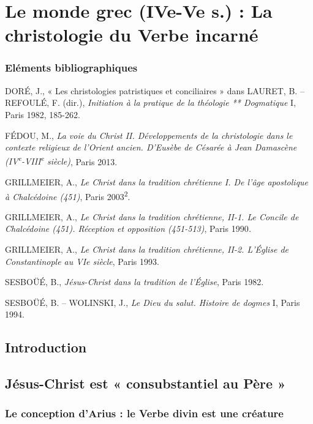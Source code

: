 

\chapter{Le monde grec (IVe-Ve s.) :
La christologie du Verbe incarné}




\subsection{Eléments bibliographiques}

DORÉ, J., « Les christologies patristiques et conciliaires » dans
LAURET, B. -- REFOULÉ, F. (dir.), \emph{Initiation à la pratique de la
théologie ** Dogmatique} I, Paris 1982, 185-262.

FÉDOU, M., \emph{La voie du Christ II. Développements de la christologie
dans le contexte religieux de l'Orient ancien. D'Eusèbe de Césarée à
Jean Damascène (IV\textsuperscript{e}-VIII\textsuperscript{e} siècle)},
Paris 2013.

GRILLMEIER, A., \emph{Le Christ dans la tradition chrétienne I. De l'âge
apostolique à Chalcédoine (451)}, Paris 2003\textsuperscript{2}.

GRILLMEIER, A., \emph{Le Christ dans la tradition chrétienne, II-1. Le
Concile de Chalcédoine (451). Réception et opposition (451-513)}, Paris
1990\emph{.}

GRILLMEIER, A., \emph{Le Christ dans la tradition chrétienne, II-2.
L'Église de Constantinople au VIe siècle}, Paris 1993.

SESBOÜÉ, B., \emph{Jésus-Christ dans la tradition de l'Église}, Paris
1982.

SESBOÜÉ, B. -- WOLINSKI, J., \emph{Le Dieu du salut. Histoire de dogmes}
I, Paris 1994.


\hypertarget{introduction}{%
\section{Introduction}\label{introduction}}




  \section{Jésus-Christ est « consubstantiel au Père »}

  
  
  
    \subsection{Le conception d'Arius : le Verbe divin est une créature}
  
